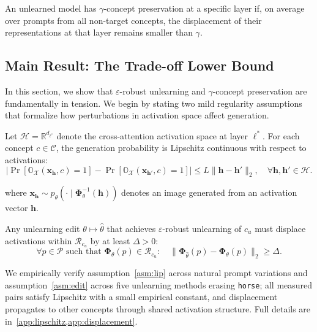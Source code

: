  An unlearned model has $\gamma$-concept preservation at a specific layer if, on average over prompts from all non-target concepts, the displacement of their representations at that layer remains smaller than $\gamma$.



\subsection{Main Result: The Trade-off Lower Bound}
\label{subsec:main_result}

In this section, we show that $\varepsilon$-robust unlearning and $\gamma$-concept preservation are fundamentally in tension.
We begin by stating two mild regularity assumptions that formalize how perturbations in activation space affect generation.

\begin{assumption}
\label{asm:lip}
Let $\mathcal{H} = \mathbb{R}^{d_{\ell^*}}$ denote the cross-attention activation space at layer $\ell^*$.
For each concept $c \in \mathcal{C}$, the generation probability is Lipschitz continuous with respect to activations:
\begin{equation}
    \left|
    \Pr[\mathbb{O}_{\mathcal{X}}(\mathbf{x}_{\mathbf{h}},c)=1]
    -
    \Pr[\mathbb{O}_{\mathcal{X}}(\mathbf{x}_{\mathbf{h}'},c)=1]
    \right|
    \leq
    L\|\mathbf{h}-\mathbf{h}'\|_2,
    \quad \forall \mathbf{h}, \mathbf{h}' \in \mathcal{H}.
\end{equation}

where $\mathbf{x}_{\mathbf{h}} \sim p_\theta(\cdot \mid \boldsymbol{\Phi}_\theta^{-1}(\mathbf{h}))$
denotes an image generated from an activation vector $\mathbf{h}$.

\end{assumption}

\begin{assumption}
\label{asm:edit}
Any unlearning edit $\theta \mapsto \hat{\theta}$ that achieves $\varepsilon$-robust unlearning of $c_u$ must displace activations within $\mathcal{R}_{c_u}$ by at least $\Delta>0$:
\begin{equation}
\label{eq:delta_lower}
    \forall p \in \mathcal{P}
    \text{ such that }
    \boldsymbol{\Phi}_{\theta}(p)\in \mathcal{R}_{c_u}:
    \quad
    \|\boldsymbol{\Phi}_{\hat{\theta}}(p)-\boldsymbol{\Phi}_{\theta}(p)\|_2
    \geq
    \Delta .
\end{equation}
\end{assumption}
We empirically verify assumption~\ref{asm:lip} across natural prompt variations and assumption~\ref{asm:edit} across five unlearning methods erasing \texttt{horse}; all measured pairs satisfy Lipschitz with a small empirical constant, 
and displacement propagates to other concepts through shared activation structure.
Full details are in~\cref{app:lipschitz,app:displacement}.


